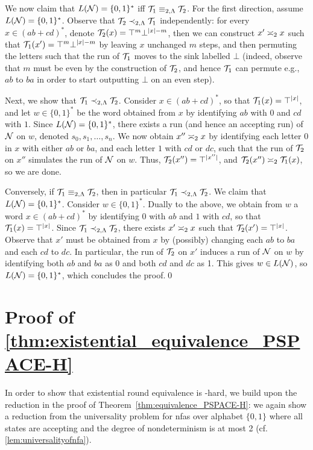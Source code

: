 We now claim that $L(\cN)=\{0,1\}^*$ iff $\cT_1\equiv_{2,\fL}\cT_2$.
For the first direction, assume $L(\cN)=\{0,1\}^*$. Observe that $\cT_2\prec_{2,\fL}\cT_1$ independently: for every $x\in (ab+cd)^*$, denote $\cT_2(x)=\top^{m}\bot^{|x|-m}$, then we can construct $x'\req[2]x$ such that $\cT_1(x')=\top^{m}\bot^{|x|-m}$ by leaving $x$ unchanged $m$ steps, and then permuting the letters such that the run of $\cT_1$ moves to the sink labelled $\bot$ (indeed, observe that $m$ must be even by the construction of $\cT_2$, and hence $\cT_1$ can permute e.g., $ab$ to $ba$ in order to start outputting $\bot$ on an even step).

Next, we show that $\cT_1\prec_{2,\fL}\cT_2$. Consider $x\in (ab+cd)^*$, so that $\cT_1(x)=\top^{|x|}$, and let $w\in \{0,1\}^*$ be the word obtained from $x$ by identifying $ab$ with $0$ and $cd$ with $1$. Since $L(\cN)=\{0,1\}^*$, there exists a run (and hence an accepting run) of $\cN$ on $w$, denoted $s_0,s_1,\ldots,s_n$. We now obtain $x''\req[2]x$ by identifying each letter $0$ in $x$ with either $ab$ or $ba$, and each letter $1$ with $cd$ or $dc$, such that the run of $\cT_2$ on $x''$ simulates the run of $\cN$ on $w$. Thus, $\cT_2(x'')=\top^{|x''|}$, and $\cT_2(x'')\req[2]\cT_1(x)$, so we are done.

Conversely, if $\cT_1\equiv_{2,\fL}\cT_2$, then in particular $\cT_1\prec_{2,\fL}\cT_2$. We claim that $L(\cN)=\{0,1\}^*$. Consider $w\in \{0,1\}^*$. Dually to the above, we obtain from $w$ a word $x\in (ab+cd)^*$ by identifying $0$ with $ab$ and $1$ with $cd$, so that $\cT_1(x)=\top^{|x|}$. 
Since $\cT_1\prec_{2,\fL}\cT_2$, there exists $x'\req[2]x$ such that $\cT_2(x')=\top^{|x|}$. Observe that $x'$ must be obtained from $x$ by (possibly) changing each $ab$ to $ba$ and each $cd$ to $dc$. In particular, the run of $\cT_2$ on $x'$ induces a run of $\cN$ on $w$ by identifying both $ab$ and $ba$ as 0 and both $cd$ and $dc$ as 1. This gives $w\in L(\cN)$, so $L(\cN)=\{0,1\}^*$, which concludes the proof.\qed

\section{Proof of \autoref{thm:existential_equivalence_PSPACE-H}}
\label{apx:proof_existential_PSPACE-H}

In order to show that existential round equivalence is \PSPACE-hard, we build upon the reduction in the proof of Theorem~\ref{thm:equivalence_PSPACE-H}: we again show a reduction from the universality problem for \glspl{nfa} over alphabet $\{0,1\}$ where all states are accepting and the degree of nondeterminism is at most 2 (cf. \autoref{lem:universalityofnfa}).

